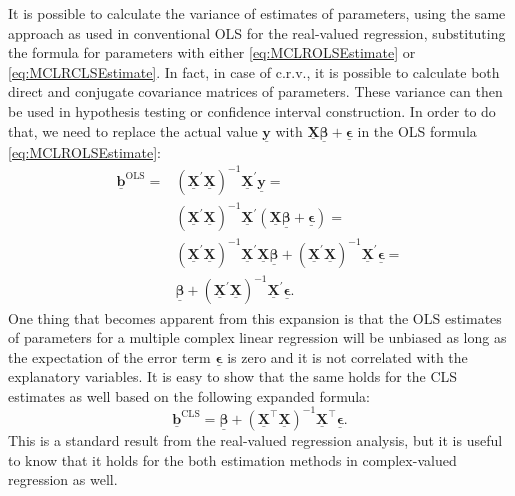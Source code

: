 \documentclass[
]{book}
\begin{document}
It is possible to calculate the variance of estimates of parameters, using the same approach as used in conventional OLS for the real-valued regression, substituting the formula for parameters with either \eqref{eq:MCLROLSEstimate} or \eqref{eq:MCLRCLSEstimate}. In fact, in case of c.r.v., it is possible to calculate both direct and conjugate covariance matrices of parameters. These variance can then be used in hypothesis testing or confidence interval construction. In order to do that, we need to replace the actual value \(\underline{\mathbf{y}}\) with \(\underline{\mathbf{X}} \underline{\boldsymbol{\beta}} + \underline{\boldsymbol{\epsilon}}\) in the OLS formula \eqref{eq:MCLROLSEstimate}:
\begin{equation}
    \begin{aligned}
    \underline{\boldsymbol{b}}^{\text{OLS}} =
        & \left( \underline{\mathbf{X}}^\prime \underline{\mathbf{X}} \right)^{-1} \underline{\mathbf{X}}^\prime \underline{\mathbf{y}} = \\
        & \left( \underline{\mathbf{X}}^\prime \underline{\mathbf{X}} \right)^{-1} \underline{\mathbf{X}}^\prime (\underline{\mathbf{X}} \underline{\boldsymbol{\beta}} + \underline{\boldsymbol{\epsilon}}) = \\
        & \left( \underline{\mathbf{X}}^\prime \underline{\mathbf{X}} \right)^{-1} \underline{\mathbf{X}}^\prime \underline{\mathbf{X}} \underline{\boldsymbol{\beta}} + \left( \underline{\mathbf{X}}^\prime \underline{\mathbf{X}} \right)^{-1} \underline{\mathbf{X}}^\prime \underline{\boldsymbol{\epsilon}} = \\
        & \underline{\boldsymbol{\beta}} + \left( \underline{\mathbf{X}}^\prime \underline{\mathbf{X}} \right)^{-1} \underline{\mathbf{X}}^\prime \underline{\boldsymbol{\epsilon}} .
    \end{aligned}
    \label{eq:MCLROLSExpansion}
\end{equation}
One thing that becomes apparent from this expansion is that the OLS estimates of parameters for a multiple complex linear regression will be unbiased as long as the expectation of the error term \(\underline{\boldsymbol{\epsilon}}\) is zero and it is not correlated with the explanatory variables. It is easy to show that the same holds for the CLS estimates as well based on the following expanded formula:
\begin{equation}
    \underline{\boldsymbol{b}}^{\text{CLS}} = \underline{\boldsymbol{\beta}} + \left( \underline{\mathbf{X}}^\top \underline{\mathbf{X}} \right)^{-1} \underline{\mathbf{X}}^\top \underline{\boldsymbol{\epsilon}} .
    \label{eq:MCLRCLSExpansion}
\end{equation}
This is a standard result from the real-valued regression analysis, but it is useful to know that it holds for the both estimation methods in complex-valued regression as well.
\end{document}
